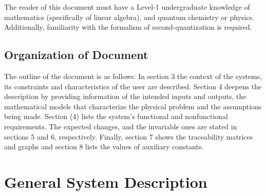 \documentclass[12pt]{article}
\begin{document}
%

The reader of this document must have a Level-1 undergraduate knowledge of 
mathematics (specifically of linear algebra), and quantum chemistry or physics. 
Additionally, familiarity with the formalism of second-quantization is required.

\subsection{Organization of Document}

	The outline of the document is as follows: In section 3 the context of the 
systems, its constraints and characteristics of the user are described. Section 
4 deepens the description by providing information of the intended inputs and 
outputs, the mathematical models that characterize the physical problem and the 
assumptions being made. Section (4) lists the system's functional and 
nonfunctional requirements. The expected changes, and the invariable ones are 
stated in sections 5 and 6, respectively. Finally, section 7 shows the 
traceability matrices and graphs and section 8 lists the values of auxiliary 
constants.

\section{General System Description}
\end{document}
